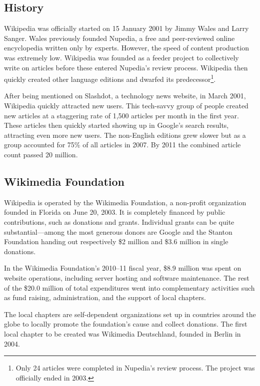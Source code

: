 
\subsection{History}

Wikipedia was officially started on 15 January 2001 by Jimmy Wales and Larry Sanger.
Wales previously founded Nupedia, a free and peer-reviewed online encyclopedia written only by experts.
However, the speed of content production was extremely low.
Wikipedia was founded as a feeder project to collectively write on articles before these entered Nupedia's review process.
Wikipedia then quickly created other language editions and dwarfed its predecessor\footnote{Only 24 articles were completed in Nupedia's review process. The project was officially ended in 2003.}.\cite{wphistory}

After being mentioned on Slashdot, a technology news website, in March 2001, Wikipedia quickly attracted new users.
This tech-savvy group of people created new articles at a staggering rate of 1,500 articles per month in the first year.
These articles then quickly started showing up in Google's search results, attracting even more new users.
The non-English editions grew slower but as a group accounted for 75\% of all articles in 2007.
By 2011 the combined article count passed 20 million.\cite{wphistory}

\subsection{Wikimedia Foundation}\label{sub:wmf}

Wikipedia is operated by the Wikimedia Foundation, a non-profit organization founded in Florida on June 20, 2003.
It is completely financed by public contributions, such as donations and grants.
Individual grants can be quite substantial---among the most generous donors are Google and the Stanton Foundation handing out respectively \$2 million and \$3.6 million in single donations.\cite{wmf}

In the Wikimedia Foundation's 2010--11 fiscal year, \$8.9 million was spent on website operations, including server hosting and software maintenance.
The rest of the \$20.0 million of total expenditures went into complementary activities such as fund raising, administration, and the support of local chapters.\cite{wmf201011}

The local chapters are self-dependent organizations set up in countries around the globe to locally promote the foundation's cause and collect donations.
The first local chapter to be created was Wikimedia Deutschland, founded in Berlin in 2004.\cite{wmf}

